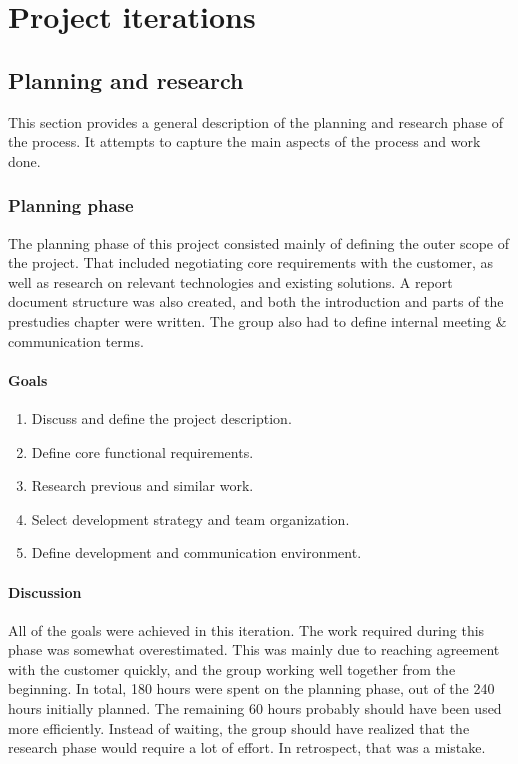 
\chapter{Project iterations}

\section{Planning and research}

This section provides a general description of the planning and research phase of the process. It attempts to capture the main aspects of the process and work done.

\subsection{Planning phase}

The planning phase of this project consisted mainly of defining the outer scope of the project. That included negotiating core requirements with the customer, as well as research on relevant technologies and existing solutions. A report document structure was also created, and both the introduction and parts of the prestudies chapter were written. The group also had to define internal meeting \& communication terms.

\subsubsection{Goals}

\begin{enumerate}
\item Discuss and define the project description.
\item Define core functional requirements.
\item Research previous and similar work.
\item Select development strategy and team organization.
\item Define development and communication environment.
\end{enumerate}

\subsubsection{Discussion}

All of the goals were achieved in this iteration. The work required during this phase was somewhat overestimated. This was mainly due to reaching agreement with the customer quickly, and the group working well together from the beginning. In total, 180 hours were spent on the planning phase, out of the 240 hours initially planned. The remaining 60 hours probably should have been used more efficiently. Instead of waiting, the group should have realized that the research phase would require a lot of effort. In retrospect, that was a mistake.


